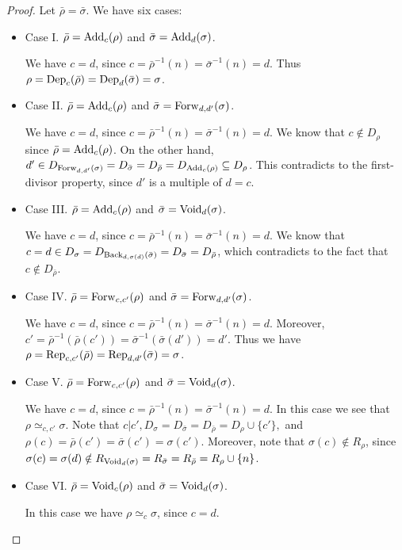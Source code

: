 \documentclass{amsart}
\theoremstyle{definition}
\begin{document}
\begin{proof}
Let $\bar{\rho}=\bar{\sigma}$. We have six cases:
\begin{itemize}
\item Case I. $\bar{\rho}={\rm Add}_{c}(\rho)$ and $\bar{\sigma}={\rm Add}_{d}(\sigma)$.

We have $c=d$, since $c=\bar{\rho}^{-1}(n)=\bar{\sigma}^{-1}(n)=d$. Thus $\rho={\rm Dep}_{c}(\bar{\rho})={\rm Dep}_{d}(\bar{\sigma})=\sigma$.
\item Case II. $\bar{\rho}={\rm Add}_{c}(\rho)$ and $\bar{\sigma}={\rm Forw}_{d,d'}(\sigma)$.

We have $c=d$, since $c=\bar{\rho}^{-1}(n)=\bar{\sigma}^{-1}(n)=d$. We know that $c\notin D_{\rho}$ since $\bar{\rho}={\rm Add}_{c}(\rho)$. On the other hand, $d'\in D_{{\rm Forw}_{d,d'}(\sigma)}= D_{\bar{\sigma}}=D_{\bar{\rho}}= D_{{\rm Add}_{c}(\rho)}\subseteq D_{\rho}$. This contradicts to the first-divisor property, since $d'$ is a multiple of $d=c$. 
\item Case III. $\bar{\rho}={\rm Add}_{c}(\rho)$ and $\bar{\sigma}={\rm Void}_{d}(\sigma)$.

We have $c=d$, since $c=\bar{\rho}^{-1}(n)=\bar{\sigma}^{-1}(n)=d$. We know that $c=d\in D_{\sigma}=D_{{\rm Back}_{d,\sigma(d)}(\bar{\sigma})}= D_{\bar{\sigma}}=D_{\bar{\rho}}$, which contradicts to the fact that $c\notin D_{\bar{\rho}}$. 
\item Case IV. $\bar{\rho}={\rm Forw}_{c,c'}(\rho)$ and $\bar{\sigma}={\rm Forw}_{d,d'}(\sigma)$.

We have $c=d$, since $c=\bar{\rho}^{-1}(n)=\bar{\sigma}^{-1}(n)=d$. Moreover, $c'=\bar{\rho}^{-1}(\bar{\rho}(c'))=\bar{\sigma}^{-1}(\bar{\sigma}(d'))=d'$. Thus we have $\rho={\rm Rep}_{c,c'}(\bar{\rho})={\rm Rep}_{d,d'}(\bar{\sigma}) =\sigma$. 
\item Case V. $\bar{\rho}={\rm Forw}_{c,c'}(\rho)$ and $\bar{\sigma}={\rm Void}_{d}(\sigma)$.

We have $c=d$, since $c=\bar{\rho}^{-1}(n)=\bar{\sigma}^{-1}(n)=d$. In this case we see that $\rho\simeq_{c,c'}\sigma$. Note that $c|c', D_\sigma=D_{\bar{\sigma}}=D_{\bar{\rho}}=D_\rho\cup\{c'\},$
and $\rho(c)=\bar{\rho}(c')=\bar{\sigma}(c')=\sigma(c')$. Moreover, note that $\sigma(c)\notin R_\rho$, since $\sigma(c)=\sigma(d)\notin R_{{\rm Void}_d(\sigma)}=R_{\bar{\sigma}} =R_{\bar{\rho}}=R_\rho\cup\{n\}$.

\item Case VI. $\bar{\rho}={\rm Void}_{c}(\rho)$ and $\bar{\sigma}={\rm Void}_{d}(\sigma)$.

In this case we have $\rho\simeq_c\sigma$, since $c=d$.
\end{itemize}
\end{proof}
\end{document}
